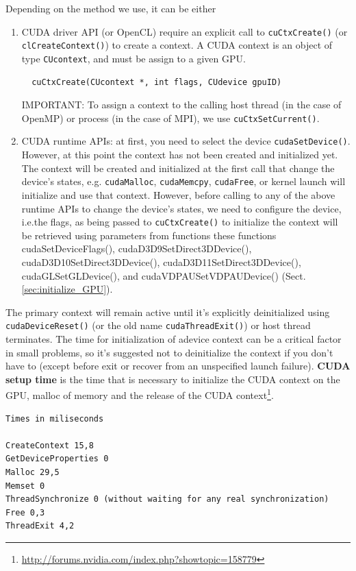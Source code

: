 Depending on the method we use, it can be either
\begin{enumerate}
  \item CUDA driver API (or OpenCL) require an explicit call to
  \verb!cuCtxCreate()! (or \verb!clCreateContext()!) to create a
  context. A CUDA context is an object of type \verb!CUcontext!, and must be
  assign to a given GPU.  
  \begin{verbatim}
  cuCtxCreate(CUcontext *, int flags, CUdevice gpuID)
  \end{verbatim}
  IMPORTANT: To assign a context to the calling host thread (in the case of
  OpenMP) or process (in the case of MPI), we use \verb!cuCtxSetCurrent()!.     
  
  \item CUDA runtime APIs: at first, you need to select the device
  \verb!cudaSetDevice()!.
  However, at this point the context has not been created and initialized yet.
  The context will be created and initialized at the first call that change the
  device's states, e.g. \verb!cudaMalloc!, \verb!cudaMemcpy!, \verb!cudaFree!, or kernel launch will
  initialize and use that context.  However, before calling to any of the above
  runtime APIs to change the device's states, we need to configure the device,
  i.e.the flags,
  as being passed to \verb!cuCtxCreate()! to initialize the context will be
  retrieved using parameters from functions these functions 
  cudaSetDeviceFlags(), cudaD3D9SetDirect3DDevice(), 
  cudaD3D10SetDirect3DDevice(), cudaD3D11SetDirect3DDevice(), 
  cudaGLSetGLDevice(), and cudaVDPAUSetVDPAUDevice() 
  (Sect.\ref{sec:initialize_GPU}).  
\end{enumerate}


\begin{framed}

The primary context will remain active until it's explicitly deinitialized using
\verb!cudaDeviceReset()! (or the old name \verb!cudaThreadExit()!) or host
thread terminates. The time for initialization of adevice context can be a
critical factor in small problems, so it's suggested not to deinitialize the
context if you don't have to (except before exit or recover from an unspecified
launch failure). {\bf CUDA setup time} is the time that is necessary to
initialize the CUDA context on the GPU, malloc of memory and the release of the
CUDA
context\footnote{\url{http://forums.nvidia.com/index.php?showtopic=158779}}.
\begin{verbatim}
Times in miliseconds

CreateContext 15,8
GetDeviceProperties 0
Malloc 29,5
Memset 0
ThreadSynchronize 0 (without waiting for any real synchronization)
Free 0,3
ThreadExit 4,2
\end{verbatim}

\end{framed}

